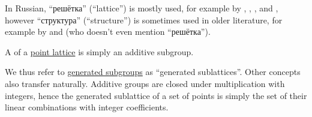 \begin{remark}
\begin{itemize}
    In Russian, \enquote{решётка} (\enquote{lattice}) is mostly used, for example by
    ,
    ,
    ,
     and
    ,
    however \enquote{структура} (\enquote{structure}) is sometimes used in older literature, for example by
     and
     (who doesn't even mention \enquote{решётка}).
  \end{itemize}
\end{remark}

\begin{definition}\label{def:point_sublattice}\mimprovised
  A  of a \hyperref[def:point_lattice]{point lattice} is simply an additive subgroup.
\end{definition}
\begin{comments}
  \item We thus refer to \hyperref[def:group/generated]{generated subgroups} as \enquote{generated sublattices}. Other concepts also transfer naturally. Additive groups are closed under multiplication with integers, hence the generated sublattice of a set of points is simply the set of their linear combinations with integer coefficients.
\end{comments}

